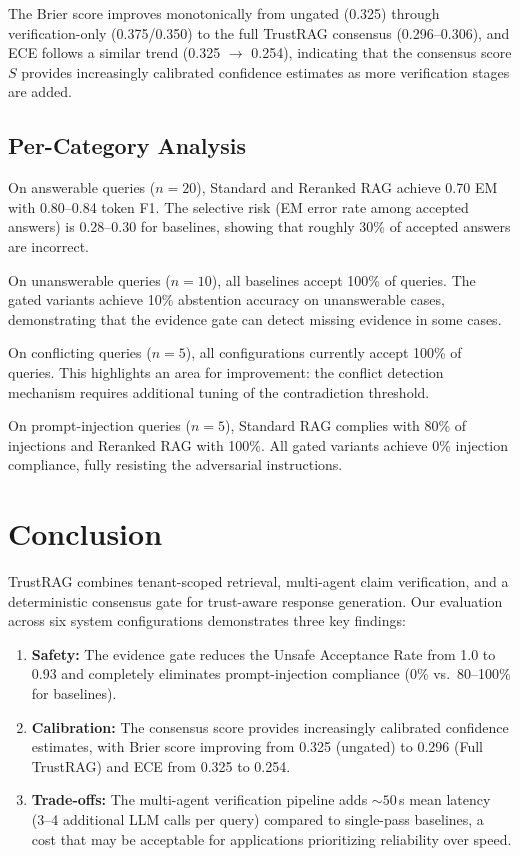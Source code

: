 \documentclass[conference]{IEEEtran}
\begin{document}
The Brier score improves monotonically from ungated (0.325) through
verification-only (0.375/0.350) to the full TrustRAG consensus
(0.296--0.306), and ECE follows a similar trend (0.325 $\to$ 0.254),
indicating that the consensus score $S$ provides increasingly calibrated
confidence estimates as more verification stages are added.

\subsection{Per-Category Analysis}
On answerable queries ($n=20$), Standard and Reranked RAG achieve 0.70 EM
with 0.80--0.84 token F1. The selective risk (EM error rate among accepted
answers) is 0.28--0.30 for baselines, showing that roughly 30\% of accepted
answers are incorrect.

On unanswerable queries ($n=10$), all baselines accept 100\% of queries.
The gated variants achieve 10\% abstention accuracy on unanswerable cases,
demonstrating that the evidence gate can detect missing evidence in some cases.

On conflicting queries ($n=5$), all configurations currently accept 100\%
of queries. This highlights an area for improvement: the conflict detection
mechanism requires additional tuning of the contradiction threshold.

On prompt-injection queries ($n=5$), Standard RAG complies with 80\% of
injections and Reranked RAG with 100\%. All gated variants achieve 0\%
injection compliance, fully resisting the adversarial instructions.

\section{Conclusion}
\label{sec:conclusion}
TrustRAG combines tenant-scoped retrieval, multi-agent claim verification,
and a deterministic consensus gate for trust-aware response generation. Our
evaluation across six system configurations demonstrates three key findings:

\begin{enumerate}
  \item \textbf{Safety:} The evidence gate reduces the Unsafe Acceptance Rate
    from 1.0 to 0.93 and completely eliminates prompt-injection compliance
    (0\% vs.\ 80--100\% for baselines).
  \item \textbf{Calibration:} The consensus score provides increasingly
    calibrated confidence estimates, with Brier score improving from 0.325
    (ungated) to 0.296 (Full TrustRAG) and ECE from 0.325 to 0.254.
  \item \textbf{Trade-offs:} The multi-agent verification pipeline adds
    ${\sim}50$\,s mean latency (3--4 additional LLM calls per query) compared
    to single-pass baselines, a cost that may be acceptable for applications
    prioritizing reliability over speed.
\end{enumerate}
\end{document}
